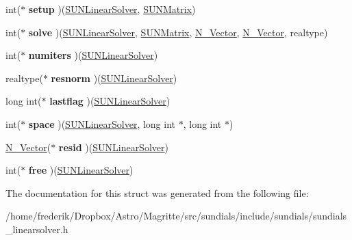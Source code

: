 \begin{DoxyCompactItemize}
\item 
\mbox{\label{struct__generic__SUNLinearSolver__Ops_a574951047e769e0fe14bcd1f14a6b17c}} 
int($\ast$ {\bfseries setup} )(\mbox{\hyperlink{struct__generic__SUNLinearSolver}{S\+U\+N\+Linear\+Solver}}, \mbox{\hyperlink{struct__generic__SUNMatrix}{S\+U\+N\+Matrix}})
\item 
\mbox{\label{struct__generic__SUNLinearSolver__Ops_a9393894c8a6e5030f5afc2d95932901b}} 
int($\ast$ {\bfseries solve} )(\mbox{\hyperlink{struct__generic__SUNLinearSolver}{S\+U\+N\+Linear\+Solver}}, \mbox{\hyperlink{struct__generic__SUNMatrix}{S\+U\+N\+Matrix}}, \mbox{\hyperlink{struct__generic__N__Vector}{N\+\_\+\+Vector}}, \mbox{\hyperlink{struct__generic__N__Vector}{N\+\_\+\+Vector}}, realtype)
\item 
\mbox{\label{struct__generic__SUNLinearSolver__Ops_ad4c817032c5152c30d3119a1885fc200}} 
int($\ast$ {\bfseries numiters} )(\mbox{\hyperlink{struct__generic__SUNLinearSolver}{S\+U\+N\+Linear\+Solver}})
\item 
\mbox{\label{struct__generic__SUNLinearSolver__Ops_af7de894396deb4091ffa39cda59bcb9b}} 
realtype($\ast$ {\bfseries resnorm} )(\mbox{\hyperlink{struct__generic__SUNLinearSolver}{S\+U\+N\+Linear\+Solver}})
\item 
\mbox{\label{struct__generic__SUNLinearSolver__Ops_a7e11155415591337b5a83b571fbaa389}} 
long int($\ast$ {\bfseries lastflag} )(\mbox{\hyperlink{struct__generic__SUNLinearSolver}{S\+U\+N\+Linear\+Solver}})
\item 
\mbox{\label{struct__generic__SUNLinearSolver__Ops_a38712c36ec8c5f0b6947f627a9dda81e}} 
int($\ast$ {\bfseries space} )(\mbox{\hyperlink{struct__generic__SUNLinearSolver}{S\+U\+N\+Linear\+Solver}}, long int $\ast$, long int $\ast$)
\item 
\mbox{\label{struct__generic__SUNLinearSolver__Ops_ab0f97ccc715665f56b09d15b4bfcae05}} 
\mbox{\hyperlink{struct__generic__N__Vector}{N\+\_\+\+Vector}}($\ast$ {\bfseries resid} )(\mbox{\hyperlink{struct__generic__SUNLinearSolver}{S\+U\+N\+Linear\+Solver}})
\item 
\mbox{\label{struct__generic__SUNLinearSolver__Ops_a01826954dbecf1a8aea0dd07fd94fdf2}} 
int($\ast$ {\bfseries free} )(\mbox{\hyperlink{struct__generic__SUNLinearSolver}{S\+U\+N\+Linear\+Solver}})
\end{DoxyCompactItemize}


The documentation for this struct was generated from the following file\+:\begin{DoxyCompactItemize}
\item 
/home/frederik/\+Dropbox/\+Astro/\+Magritte/src/sundials/include/sundials/sundials\+\_\+linearsolver.\+h\end{DoxyCompactItemize}
